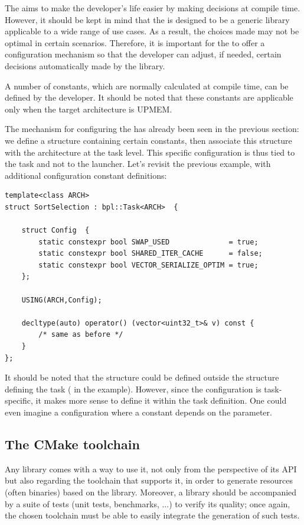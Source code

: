 The \BPL aims to make the developer's life easier by making decisions at compile time.  However, it should be kept in mind that the \BPL is designed to be a generic library applicable  to a wide range of use cases. As a result, the choices made may not be optimal in certain scenarios.  Therefore, it is important for the \BPL to offer a configuration mechanism so that the developer can adjust, if needed, certain decisions automatically made by the library.  

A number of constants, which are normally calculated at compile time, can be defined by the developer.  It should be noted that these constants are applicable only when the target architecture is UPMEM.

The mechanism for configuring the \BPL has already been seen in the previous section: we define a structure containing certain constants, then associate this structure with the architecture at the task level. This specific configuration is thus tied to the task and not to the launcher. Let’s revisit the previous example, with additional configuration constant definitions:

\begin{verbatim}
template<class ARCH>
struct SortSelection : bpl::Task<ARCH>  {
	
    struct Config  {
        static constexpr bool SWAP_USED              = true;
        static constexpr bool SHARED_ITER_CACHE      = false;
        static constexpr bool VECTOR_SERIALIZE_OPTIM = true;
    };
	
    USING(ARCH,Config);

    decltype(auto) operator() (vector<uint32_t>& v) const { 
        /* same as before */
    }
};
\end{verbatim}

It should be noted that the  structure could be defined outside the structure defining the task ( in the example). However, since the configuration is task-specific, it makes more sense to define it within the task definition. One could even imagine a configuration where a constant depends on the  parameter.

\subsection{The CMake toolchain}

Any library comes with a way to use it, not only from the perspective of its API but also regarding the toolchain that supports it, in order to generate resources (often binaries) based on the library. Moreover, a library should be accompanied by a suite of tests (unit tests, benchmarks, ...) to verify its quality; once again, the chosen toolchain must be able to easily integrate the generation of such tests.

